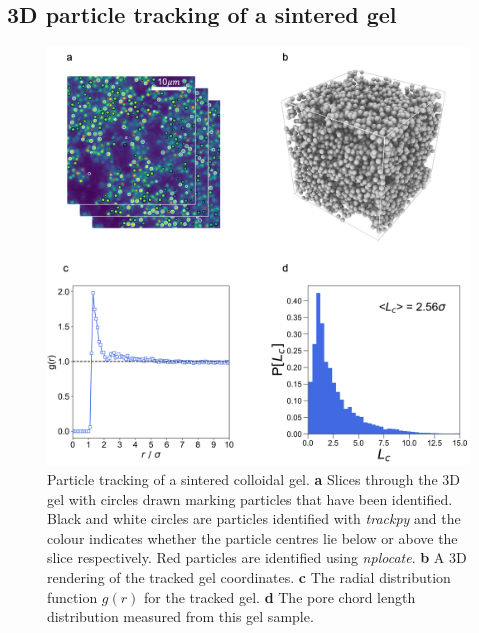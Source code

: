 \subsection{3D particle tracking of a sintered gel}
\label{sec:ParticleTracking}
\begin{figure}
	\centering
	\includegraphics[width=\linewidth]{figsExpSystem/figParticleTracking.png}
	\caption[3D particle tracking of a sintered gel]{Particle tracking of a sintered colloidal gel. \textbf{a} Slices through the 3D gel with circles drawn marking particles that have been identified. Black and white circles are particles identified with \textit{trackpy} and the colour indicates whether the particle centres lie below or above the slice respectively. Red particles are identified using \textit{nplocate}. \textbf{b} A 3D rendering of the tracked gel coordinates. \textbf{c} The radial distribution function $g(r)$ for the tracked gel. \textbf{d} The pore chord length distribution measured from this gel sample.}
	\label{fig:ParticleTracking}
\end{figure}


